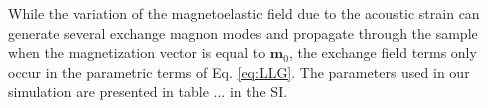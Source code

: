 \documentclass[%
superscriptaddress,
preprint,
showpacs,
amsmath,
amssymb,
aps,
prl,
]{revtex4-1}
\begin{document}
While the variation of the magnetoelastic field due to the acoustic strain can generate several exchange magnon modes and propagate through the sample when the magnetization vector is equal to $\mathbf{m}_0$,
the exchange field terms only occur in the parametric terms of Eq. \eqref{eq:LLG}.
The parameters used in our simulation are presented in table ... in the SI.
\end{document}
